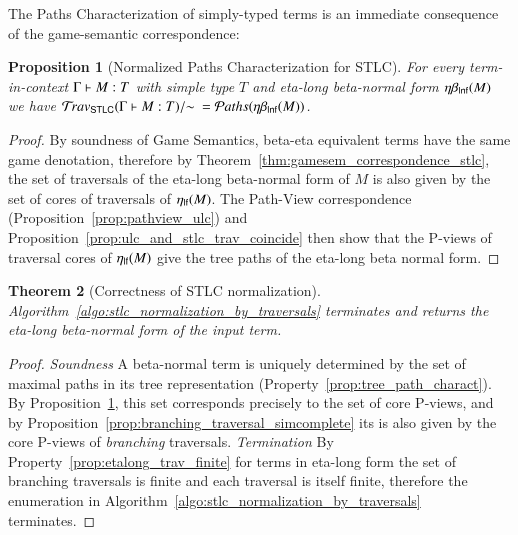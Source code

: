 \documentclass{elsarticle}
\theoremstyle{plain}
\newtheorem{theorem}{Theorem}[section]
\newtheorem{proposition}[theorem]{Proposition}
\theoremstyle{definition}
\theoremstyle{remark}
\newcommand{\travstlc}{{\travset_{\sf STLC}}}
\newcommand\pathset{{\mathcal{P}aths}} %
\begin{document}


The Paths Characterization of simply-typed terms is an immediate consequence of the game-semantic correspondence:
\begin{proposition}[Normalized Paths Characterization for STLC]
\label{prop:path_charact_stlc}
For every term-in-context $\Gamma \vdash M : T$
with simple type $T$ and eta-long beta-normal form $\eta\beta_{\sf lnf}(M)$ we have
$\travstlc(\Gamma \entail M : T)/{\sim}\ = \pathset(\etabetalnf{M})$.
\end{proposition}
\begin{proof}
 By soundness of Game Semantics, beta-eta equivalent terms have the same game denotation, therefore by Theorem~\ref{thm:gamesem_correspondence_stlc}, the set of traversals of the eta-long beta-normal form of $M$ is also given by the set of cores of traversals of $\eta_{\sf lf}(M)$. The Path-View correspondence (Proposition~\ref{prop:pathview_ulc}) and Proposition~\ref{prop:ulc_and_stlc_trav_coincide} then show that the P-views of traversal cores of $\eta_{\sf lf}(M)$ give the tree paths of the eta-long beta normal form.
\end{proof}


\begin{theorem}[Correctness of STLC normalization]
Algorithm~\ref{algo:stlc_normalization_by_traversals} terminates and returns the eta-long beta-normal form of the input term.
\end{theorem}
\begin{proof}
\emph{Soundness} A beta-normal term is uniquely determined by the set of maximal paths in its tree representation (Property~\ref{prop:tree_path_charact}). By Proposition~\ref{prop:path_charact_stlc}, this set corresponds precisely to the set of core P-views,
and by Proposition~\ref{prop:branching_traversal_simcomplete} its is also given by the core P-views of \emph{branching} traversals.
\emph{Termination} By Property~\ref{prop:etalong_trav_finite} for terms in eta-long form the set of branching traversals is finite and each traversal is itself finite, therefore the enumeration in Algorithm~\ref{algo:stlc_normalization_by_traversals} terminates.
\end{proof}
\end{document}
